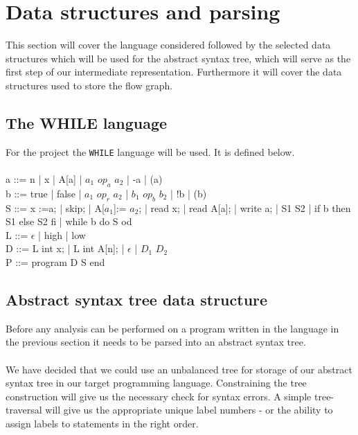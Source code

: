 \section{Data structures and parsing}
This section will cover the language considered followed by the selected data structures which will be used for the abstract syntax tree, which will serve as the first step of our intermediate representation. Furthermore it will cover the data structures used to store the flow graph.

\subsection{The WHILE language}
For the project the \texttt{WHILE} language will be used. It is defined below.
\\\\
a ::= n | x | A[a] | $a_1$ $op_a$ $a_2$ | -a | (a)\\
b ::= true | false | $a_1$ $op_r$ $a_2$ | $b_1$ $op_b$ $b_2$ | !b | (b)\\
S ::= x :=a; | skip; | A[$a_1$]:= $a_2$; | read x; | read A[a]; | write a; | S1 S2 | if b then S1 else S2 fi | while b do S od\\
L ::= $\epsilon$ | high | low\\
D ::= L int x; | L int A[n]; | $\epsilon$ | $D_1$ $D_2$\\
P ::= program D S end\\

\subsection{Abstract syntax tree data structure}\label{section:Abstractsyntaxtreedatastructure}
\label{sec:constructing_ast}
Before any analysis can be performed on a program written in the language in the previous section it needs to be parsed into an abstract syntax tree.\\\\
We have decided that we could use an unbalanced tree for storage of our abstract syntax tree in our target programming language. Constraining the tree construction will give us the necessary check for syntax errors.
A simple tree-traversal will give us the appropriate unique label numbers - or the ability to assign labels to statements in the right order.

